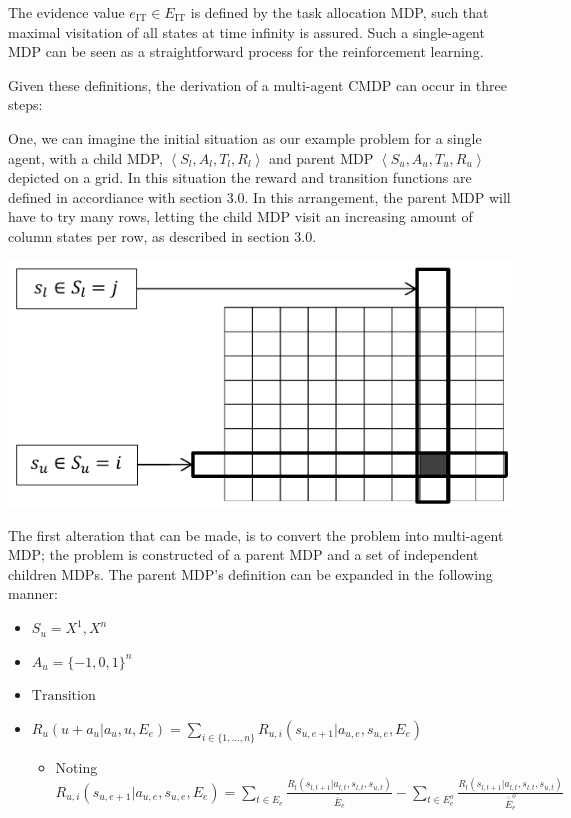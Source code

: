 \documentclass[compsoc,journal,letterpaper,10pt,draftcls,twocolumn]{IEEEtran}
\begin{document}
The evidence value \(e_{\text{IT}} \in E_{\text{IT}}\) is defined by
the task allocation MDP, such that maximal visitation of all states at
time infinity is assured. Such a single-agent MDP can be seen as a
straightforward process for the reinforcement learning.

Given these definitions, the derivation of a multi-agent CMDP can occur
in three steps:

One, we can imagine the initial situation as our example problem for a
single agent, with a child MDP,
\(\left\langle S_{l},A_{l},T_{l},R_{l} \right\rangle\) and parent MDP
\(\left\langle S_{u},A_{u},T_{u},R_{u} \right\rangle\) depicted on a
grid. In this situation the reward and transition functions are defined
in accordiance with section 3.0. In this arrangement, the parent MDP
will have to try many rows, letting the child MDP visit an increasing
amount of column states per row, as described in section 3.0.

 
\includegraphics{media/figure7.pdf}
 

The first alteration that can be made, is to convert the problem into
multi-agent MDP; the problem is constructed of a parent MDP and a set of
independent children MDPs. The parent MDP's definition can be expanded
in the following manner:

\begin{itemize}
\item
  \(S_{u}  = X^{1},X^{n}\)
\item
  \(A_{u} = {\{ - 1, 0, 1\}}^{n}\)
\item
  \(\text{Transition}\)
\item
  \(R_{u}\left( u + a_{u}|a_{u}, u, E_{e} \right) = \sum_{i \in \{ 1,\ldots,n\}}R_{u,i}\left( s_{u,e + 1}|a_{u,e}, s_{u,e}, E_{e} \right)\)

  \begin{itemize}
  \item
    Noting
    \(R_{u,i}\left( s_{u,e + 1}|a_{u,e}, s_{u,e}, E_{e} \right) = \sum_{t \in E_{e}}^{\ }\frac{R_{l}\left( s_{l, t + 1}|a_{l,t}, s_{l,t}, s_{u,t} \right)}{\overline{\overline E}_{e}} - \sum_{t \in E_{e}^{o}}^{\ }\frac{R_{l}\left( s_{l,t + 1}|a_{l,t}, s_{l,t}, s_{u,t} \right)}{\overline{\overline E}_{e}^{o}}\)
  \end{itemize}
\end{itemize}
\end{document}
